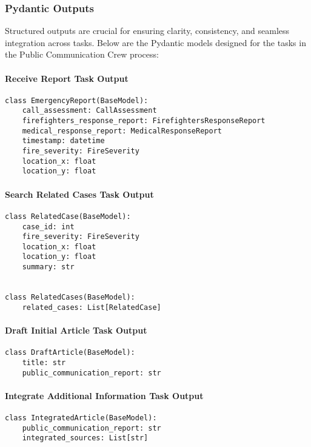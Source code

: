 \subsubsection{Pydantic Outputs}

Structured outputs are crucial for ensuring clarity, consistency, and seamless integration across tasks. Below are the Pydantic models designed for the tasks in the Public Communication Crew process:

\paragraph{Receive Report Task Output}
\begin{lstlisting}[caption={Pydantic model for Receive Report Task Output}]
class EmergencyReport(BaseModel):
    call_assessment: CallAssessment
    firefighters_response_report: FirefightersResponseReport
    medical_response_report: MedicalResponseReport
    timestamp: datetime
    fire_severity: FireSeverity
    location_x: float
    location_y: float
\end{lstlisting}

\paragraph{Search Related Cases Task Output}
\begin{lstlisting}[caption={Pydantic model for Search Related Cases Task Output}]
class RelatedCase(BaseModel):
    case_id: int
    fire_severity: FireSeverity
    location_x: float
    location_y: float
    summary: str


class RelatedCases(BaseModel):
    related_cases: List[RelatedCase]
\end{lstlisting}

\paragraph{Draft Initial Article Task Output}
\begin{lstlisting}[caption={Pydantic model for Draft Initial Article Task Output}]
class DraftArticle(BaseModel):
    title: str
    public_communication_report: str
\end{lstlisting}

\paragraph{Integrate Additional Information Task Output}
\begin{lstlisting}[caption={Pydantic model for Integrate Additional Information Task Output}]
class IntegratedArticle(BaseModel):
    public_communication_report: str
    integrated_sources: List[str]
\end{lstlisting}

